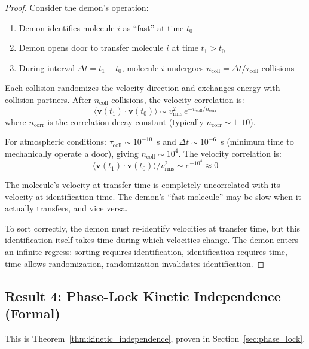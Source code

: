 \documentclass[twocolumn,showpacs,preprintnumbers,amsmath,amssymb,prd]{revtex4-2}
\theoremstyle{definition}
\theoremstyle{remark}
\begin{document}
\begin{proof}
Consider the demon's operation:
\begin{enumerate}
\item Demon identifies molecule $i$ as ``fast'' at time $t_0$
\item Demon opens door to transfer molecule $i$ at time $t_1 > t_0$
\item During interval $\Delta t = t_1 - t_0$, molecule $i$ undergoes $n_{\text{coll}} = \Delta t / \tau_{\text{coll}}$ collisions
\end{enumerate}

Each collision randomizes the velocity direction and exchanges energy with collision partners. After $n_{\text{coll}}$ collisions, the velocity correlation is:
\begin{equation}
\langle \mathbf{v}(t_1) \cdot \mathbf{v}(t_0) \rangle \sim v_{\text{rms}}^2 \, e^{-n_{\text{coll}}/n_{\text{corr}}}
\end{equation}
where $n_{\text{corr}}$ is the correlation decay constant (typically $n_{\text{corr}} \sim 1$--$10$).

For atmospheric conditions: $\tau_{\text{coll}} \sim 10^{-10}$~s and $\Delta t \sim 10^{-6}$~s (minimum time to mechanically operate a door), giving $n_{\text{coll}} \sim 10^4$. The velocity correlation is:
\begin{equation}
\langle \mathbf{v}(t_1) \cdot \mathbf{v}(t_0) \rangle / v_{\text{rms}}^2 \sim e^{-10^4} \approx 0
\end{equation}

The molecule's velocity at transfer time is completely uncorrelated with its velocity at identification time. The demon's ``fast molecule'' may be slow when it actually transfers, and vice versa.

To sort correctly, the demon must re-identify velocities at transfer time, but this identification itself takes time during which velocities change. The demon enters an infinite regress: sorting requires identification, identification requires time, time allows randomization, randomization invalidates identification.
\end{proof}

\subsection{Result 4: Phase-Lock Kinetic Independence (Formal)}

This is Theorem~\ref{thm:kinetic_independence}, proven in Section~\ref{sec:phase_lock}.
\end{document}
